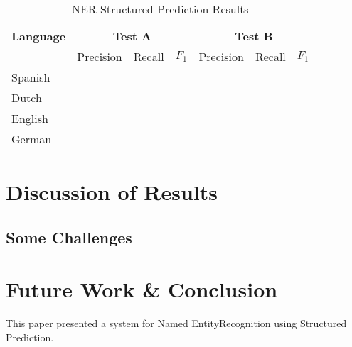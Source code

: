 \documentclass[11pt]{article}
\newcommand{\namedentity}{Named Entity}
\begin{document}
\begin{table*}[t]
\centering
\begin{tabular}{| l | l l l| l l l |}

\hline
\bf Language & \multicolumn{3}{c|}{ \bf Test A}&\multicolumn{3}{c|}{ \bf Test B}\\
             & Precision & Recall & $F_1$ & Precision & Recall & $F_1$ \\ \hline
Spanish &       &          &     &          &               & \\
Dutch  &         &          &     &          &               &   \\
English &        &          &     &          &               &       \\
German &      &          &       &          &             & \\
\hline
\end{tabular}
\caption{NER Structured Prediction Results }
\label{table:Results}
\end{table*}

\section{Discussion of Results}

\subsection*{Some Challenges} %


\section{Future Work \& Conclusion}

This paper presented a system for \namedentity Recognition using Structured Prediction. 




\end{document}
